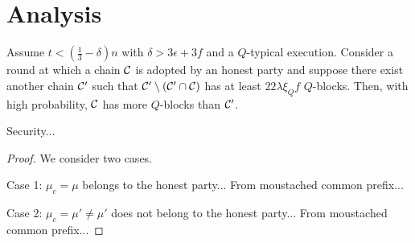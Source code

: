 \section{Analysis}

\begin{lemma}\label{lemma:qblockcommonprefix}
	Assume $t<(\frac{1}{3}-\delta)n$ with $\delta>3\epsilon+3f$ and a $Q$-typical
	execution.
	Consider a round at which a chain $\mathcal{C}$ is adopted by an honest party and
	suppose there exist another chain $\mathcal{C}'$ such that
	$\mathcal{C}'\setminus(\mathcal{C}'\cap\mathcal{C})$ has at least $22\lambda\xi_Qf$ $Q$-blocks.
	Then, with high probability, $\mathcal{C}$ has more $Q$-blocks than $\mathcal{C}'$.
\end{lemma}

\begin{lemma}
  Security...
\end{lemma}
\begin{proof}
  We consider two cases.

  Case 1: $\mu_c = \mu$ belongs to the honest party...
  From moustached common prefix...

  Case 2: $\mu_c = \mu' \neq \mu'$ does not belong to the honest party...
  From moustached common prefix...
\end{proof}
